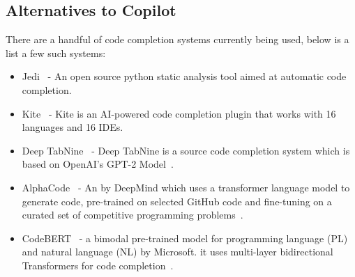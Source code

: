 \subsection{Alternatives to Copilot}
There are a handful of code completion systems currently being used, below is a list a few such systems:

\begin{itemize}
    \item Jedi~\cite{jedi} - An open source python static analysis tool aimed at automatic code completion.
    \item Kite~\cite{kite} - Kite is an AI-powered code completion plugin that works with 16 languages and 16 IDEs.
    \item Deep TabNine~\cite{tabnine} - Deep TabNine is a source code completion system which is based on OpenAI's GPT-2 Model~\cite{gpt2}.
    \item AlphaCode~\cite{alphacode} - An \cct{} by DeepMind which uses a transformer language model to generate code, pre-trained on selected GitHub code and fine-tuning on a curated set of competitive programming problems~\cite{alphacode}.
    \item CodeBERT~\cite{codebert} - a bimodal pre-trained model for programming language (PL) and natural language (NL) by Microsoft. it uses multi-layer bidirectional Transformers for code completion~\cite{codebert}.
\end{itemize}
